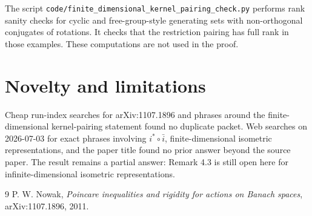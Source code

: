 \documentclass[11pt]{article}
\begin{document}
The script
\texttt{code/finite\_dimensional\_kernel\_pairing\_check.py} performs rank
sanity checks for cyclic and free-group-style generating sets with non-orthogonal
conjugates of rotations. It checks that the restriction pairing has full rank in
those examples. These computations are not used in the proof.

\section*{Novelty and limitations}

Cheap run-index searches for arXiv:1107.1896 and phrases around the
finite-dimensional kernel-pairing statement found no duplicate packet. Web
searches on 2026-07-03 for exact phrases involving \(i^*\circ\bar i\),
finite-dimensional isometric representations, and the paper title found no
prior answer beyond the source paper. The result remains a partial answer:
Remark 4.3 is still open here for infinite-dimensional isometric
representations.

\begin{thebibliography}{9}
P. W. Nowak,
\emph{Poincare inequalities and rigidity for actions on Banach spaces},
arXiv:1107.1896, 2011.
\end{thebibliography}
\end{document}

